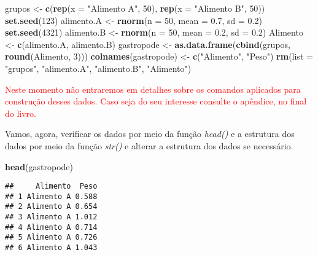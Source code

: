 \documentclass[]{book}
\newenvironment{Shaded}{\begin{snugshade}}{\end{snugshade}}
\newcommand{\DataTypeTok}[1]{\textcolor[rgb]{0.13,0.29,0.53}{#1}}
\newcommand{\DecValTok}[1]{\textcolor[rgb]{0.00,0.00,0.81}{#1}}
\newcommand{\FloatTok}[1]{\textcolor[rgb]{0.00,0.00,0.81}{#1}}
\newcommand{\KeywordTok}[1]{\textcolor[rgb]{0.13,0.29,0.53}{\textbf{#1}}}
\newcommand{\NormalTok}[1]{#1}
\newcommand{\StringTok}[1]{\textcolor[rgb]{0.31,0.60,0.02}{#1}}
\begin{document}
\begin{Shaded}
\begin{Highlighting}[]
\NormalTok{grupos <-}\StringTok{ }\KeywordTok{c}\NormalTok{(}\KeywordTok{rep}\NormalTok{(}\DataTypeTok{x =} \StringTok{"Alimento A"}\NormalTok{, }\DecValTok{50}\NormalTok{), }\KeywordTok{rep}\NormalTok{(}\DataTypeTok{x =} \StringTok{"Alimento B"}\NormalTok{, }\DecValTok{50}\NormalTok{))}
\KeywordTok{set.seed}\NormalTok{(}\DecValTok{123}\NormalTok{)}
\NormalTok{alimento.A <-}\StringTok{ }\KeywordTok{rnorm}\NormalTok{(}\DataTypeTok{n =} \DecValTok{50}\NormalTok{, }\DataTypeTok{mean =} \FloatTok{0.7}\NormalTok{, }\DataTypeTok{sd =} \FloatTok{0.2}\NormalTok{)}
\KeywordTok{set.seed}\NormalTok{(}\DecValTok{4321}\NormalTok{)}
\NormalTok{alimento.B <-}\StringTok{ }\KeywordTok{rnorm}\NormalTok{(}\DataTypeTok{n =} \DecValTok{50}\NormalTok{, }\DataTypeTok{mean =} \FloatTok{0.2}\NormalTok{, }\DataTypeTok{sd =} \FloatTok{0.2}\NormalTok{)}
\NormalTok{Alimento <-}\StringTok{ }\KeywordTok{c}\NormalTok{(alimento.A, alimento.B)}
\NormalTok{gastropode <-}\StringTok{ }\KeywordTok{as.data.frame}\NormalTok{(}\KeywordTok{cbind}\NormalTok{(grupos, }\KeywordTok{round}\NormalTok{(Alimento, }\DecValTok{3}\NormalTok{)))}
\KeywordTok{colnames}\NormalTok{(gastropode) <-}\StringTok{ }\KeywordTok{c}\NormalTok{(}\StringTok{"Alimento"}\NormalTok{, }\StringTok{"Peso"}\NormalTok{)}
\KeywordTok{rm}\NormalTok{(}\DataTypeTok{list =} \StringTok{"grupos"}\NormalTok{, }\StringTok{"alimento.A"}\NormalTok{, }\StringTok{"alimento.B"}\NormalTok{, }\StringTok{"Alimento"}\NormalTok{)}
\end{Highlighting}
\end{Shaded}

\textcolor{red}{Neste momento não entraremos em detalhes sobre os comandos aplicados para construção desses dados. Caso seja do seu interesse consulte o apêndice, no final do livro.}

Vamos, agora, verificar os dados por meio da função \emph{head()} e a estrutura dos dados por meio da função \emph{str()} e alterar a estrutura dos dados se necessário.

\begin{Shaded}
\begin{Highlighting}[]
\KeywordTok{head}\NormalTok{(gastropode)}
\end{Highlighting}
\end{Shaded}

\begin{verbatim}
##     Alimento  Peso
## 1 Alimento A 0.588
## 2 Alimento A 0.654
## 3 Alimento A 1.012
## 4 Alimento A 0.714
## 5 Alimento A 0.726
## 6 Alimento A 1.043
\end{verbatim}
\end{document}
